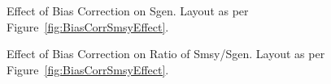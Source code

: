\documentclass[french,11pt]{book}
\begin{document}
\begin{figure}[htb]

{\centering {} 

}

\caption{Effect of Bias Correction on Sgen. Layout as per Figure~\ref{fig:BiasCorrSmsyEffect}.}\label{fig:BiasCorrSgenEffect}
\end{figure}
\clearpage


\begin{figure}[htb]

{\centering {} 

}

\caption{Effect of Bias Correction on Ratio of Smsy/Sgen. Layout as per Figure~\ref{fig:BiasCorrSmsyEffect}.}\label{fig:BiasCorrRatioEffect}
\end{figure}
\clearpage
\end{document}
